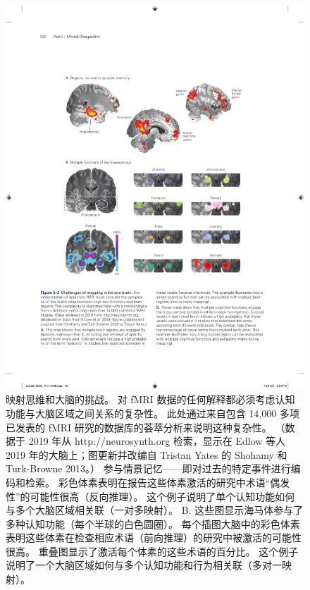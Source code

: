 \begin{figure}[htbp]
	\centering
	\includegraphics[width=1.0\linewidth]{chap06/fig_6_3}
	\caption{映射思维和大脑的挑战。 
		对 fMRI 数据的任何解释都必须考虑认知功能与大脑区域之间关系的复杂性。 
		此处通过来自包含 14,000 多项已发表的 fMRI 研究的数据库的荟萃分析来说明这种复杂性。 
		（数据于 2019 年从 http://neurosynth.org 检索，显示在 Edlow 等人 2019 年的大脑上；图更新并改编自 Tristan Yates 的 Shohamy 和 Turk-Browne 2013。） 参与情景记忆——即对过去的特定事件进行编码和检索。 
		彩色体素表明在报告这些体素激活的研究中术语“偶发性”的可能性很高（反向推理）。 
		这个例子说明了单个认知功能如何与多个大脑区域相关联（一对多映射）。 
		B. 这些图显示海马体参与了多种认知功能（每个半球的白色圆圈）。 
		每个插图大脑中的彩色体素表明这些体素在检查相应术语（前向推理）的研究中被激活的可能性很高。 
		重叠图显示了激活每个体素的这些术语的百分比。 
		这个例子说明了一个大脑区域如何与多个认知功能和行为相关联（多对一映射）。}
	\label{fig:6_3}
\end{figure}

